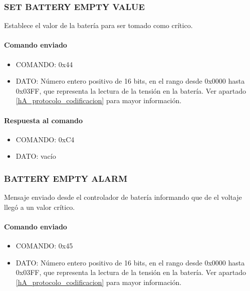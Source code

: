 \subsubsection{SET BATTERY EMPTY VALUE}
\label{hA_protocolo_set_battery_empty_value}

Establece el valor de la bater\'ia para ser tomado como cr\'itico.

\paragraph*{Comando enviado}

\begin{itemize}
	\item{COMANDO:} 0x44
	\item{DATO:} N\'umero entero positivo de 16 bits, en el rango desde 0x0000 hasta 0x03FF, que representa la lectura de la tensi\'on en la bater\'ia.
		Ver apartado \ref{hA_protocolo_codificacion} para mayor informaci\'on.
\end{itemize}

\paragraph*{Respuesta al comando}

\begin{itemize}
	\item{COMANDO:} 0xC4
	\item{DATO:} vac\'io
\end{itemize}

\subsubsection{BATTERY EMPTY ALARM}
\label{hA_protocolo_battery_empty}

Mensaje enviado desde el controlador de bater\'ia informando que de el voltaje lleg\'o a un valor cr\'itico.

\paragraph*{Comando enviado}

\begin{itemize}
	\item{COMANDO:} 0x45
	\item{DATO:} N\'umero entero positivo de 16 bits, en el rango desde 0x0000 hasta 0x03FF, que representa la lectura de la tensi\'on en la bater\'ia.
		Ver apartado \ref{hA_protocolo_codificacion} para mayor informaci\'on.
\end{itemize}

